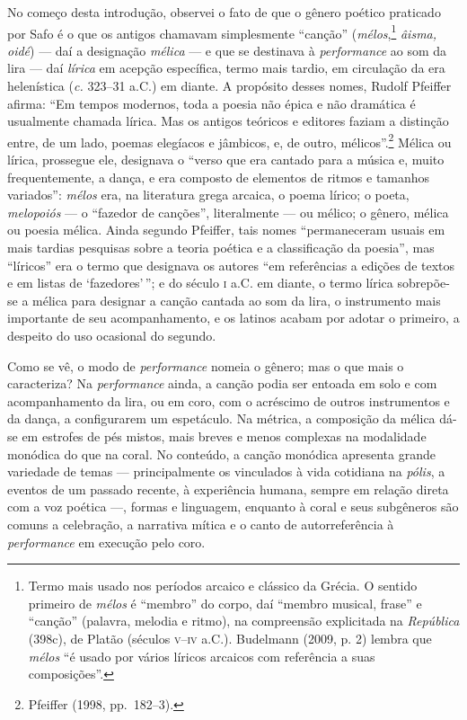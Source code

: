 No começo desta introdução, observei o fato de que o gênero poético praticado
por Safo é o que os antigos chamavam simplesmente “canção”
(\textit{mélos},\footnote{ Termo mais usado nos períodos arcaico e clássico da
Grécia. O sentido primeiro de \textit{mélos} é “membro” do corpo, daí “membro
musical, frase” e “canção” (palavra, melodia e ritmo), na compreensão
explicitada na \textit{República} (398c), de Platão (séculos \textsc{v}--\textsc{iv} a.C.).
Budelmann (2009, p. 2) lembra que \textit{mélos} “é usado por vários líricos
arcaicos com referência a suas composições”.} \textit{âisma, oidé}) --- daí a
designação \textit{mélica} --- e que se destinava à \textit{performance} ao som
da lira --- daí \textit{lírica} em acepção específica, termo mais tardio, em
circulação da era helenística (\textit{c.} 323--31 a.C.) em diante. A propósito
desses nomes, Rudolf Pfeiffer afirma: “Em tempos
modernos, toda a poesia não épica e não dramática é usualmente chamada lírica.
Mas os antigos teóricos e editores faziam a distinção entre, de um lado, poemas
elegíacos e jâmbicos, e, de outro, mélicos”.\footnote{ Pfeiffer (1998, pp.~182--3).} Mélica ou lírica, prossegue ele,
designava o “verso que era cantado para a música e, muito frequentemente, a
dança, e era composto de elementos de ritmos e tamanhos variados”:
\textit{mélos} era, na literatura grega arcaica, o poema lírico; o poeta,
\textit{melopoiós} --- o “fazedor de canções”, literalmente --- ou mélico; o
gênero, mélica ou poesia mélica. Ainda segundo Pfeiffer, tais nomes
“permaneceram usuais em mais tardias pesquisas sobre a teoria poética e a
classificação da poesia”, mas “líricos” era o termo que designava os autores
“em referências a edições de textos e em listas de ‘fazedores’\,”; e do século \textsc{i}
a.C. em diante, o termo lírica sobrepõe-se a mélica para designar a canção
cantada ao som da lira, o instrumento mais importante de seu acompanhamento, e
os latinos acabam por adotar o primeiro, a despeito do uso ocasional do
segundo.

Como se vê, o modo de \textit{performance} nomeia o gênero;
mas o que mais o caracteriza? Na \textit{performance} ainda, a canção podia ser
entoada em solo e com acompanhamento da lira, ou em coro, com o acréscimo de
outros instrumentos e da dança, a configurarem um espetáculo. Na métrica, a
composição da mélica dá-se em estrofes de pés mistos, mais breves e menos
complexas na modalidade monódica do que na coral. No conteúdo, a canção
monódica apresenta grande variedade de temas --- principalmente os vinculados à
vida cotidiana na \textit{pólis}, a eventos de um passado recente, à
experiência humana, sempre em relação direta com a voz poética ---, formas e
linguagem, enquanto à coral e seus subgêneros são comuns a celebração, a
narrativa mítica e o canto de autorreferência à \textit{performance} em
execução pelo coro. 

